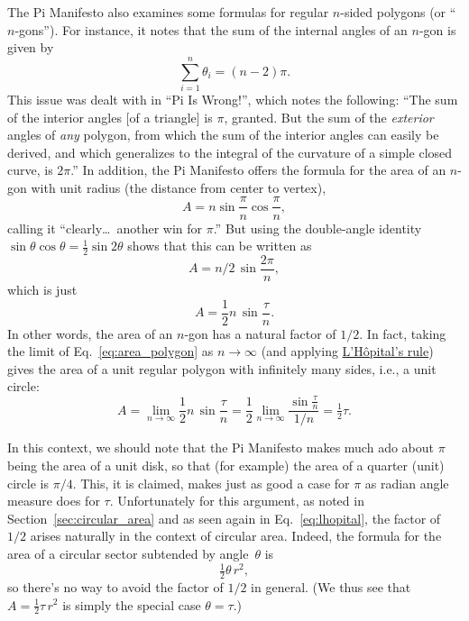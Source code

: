 The Pi Manifesto also examines some formulas for regular
$n$-sided polygons (or ``$n$-gons''). For instance, it notes that the sum of the internal angles of an $n$-gon is given by
\[
\sum_{i=1}^n \theta_i=(n-2)\pi.
\]
This issue was dealt with in ``Pi Is Wrong!'', which notes the following: ``The sum of the interior angles [of a
triangle] is $\pi$, granted. But the sum of the \emph{exterior} angles of \emph{any}
polygon, from which the sum of the interior angles can easily be
derived, and which generalizes to the integral of the curvature of a
simple closed curve, is $2\pi$.'' In addition, the Pi Manifesto offers the formula for the area of an $n$-gon with unit radius (the distance from center to vertex),
\[ A=n\sin\frac{\pi}{n}\cos\frac{\pi}{n}, \]
calling it ``clearly\ldots\ another win for $\pi$.'' But using the double-angle identity $\sin\theta\cos\theta = \frac{1}{2} \sin 2\theta$ shows that this can be written as
\[ A = n/2\, \sin\frac{2\pi}{n}, \]
which is just
\begin{equation}
\label{eq:area_polygon}
A = \frac{1}{2} n\, \sin\frac{\tau}{n}.
\end{equation}
In other words, the area of an $n$-gon has a natural
factor of $1/2$. In fact, taking the limit of Eq.~\eqref{eq:area_polygon} as $n\rightarrow \infty$ (and applying \href{https://mathworld.wolfram.com/LHospitalsRule.html}{L'H\^{o}pital's rule}) gives the area of a unit regular polygon with infinitely many sides, i.e., a unit circle:
\begin{equation}
\label{eq:lhopital}
A = \lim_{n\rightarrow\infty} \frac{1}{2} n\, \sin\frac{\tau}{n}
= \frac{1}{2} \lim_{n\rightarrow\infty} \frac{\sin\frac{\tau}{n}}{1/n} = \tfrac{1}{2}\tau.
\end{equation}

In this context, we should note that the Pi Manifesto makes much ado about $\pi$ being the area of a unit disk, so that (for example) the area of a quarter (unit) circle is $\pi/4$. This, it is claimed, makes just as good a case for $\pi$ as radian angle measure does for $\tau$. Unfortunately for this argument, as noted in Section~\ref{sec:circular_area} and as seen again in Eq.~\eqref{eq:lhopital}, the factor of $1/2$ arises naturally in the context of circular area. Indeed, the formula for the area of a circular sector subtended by angle~$\theta$ is
\[
\tfrac{1}{2}\theta\, r^2,
\]
so there's no way to avoid the factor of $1/2$ in general. (We thus see that $A =
\frac{1}{2} \tau\, r^2$ is simply the special case $\theta = \tau$.)

